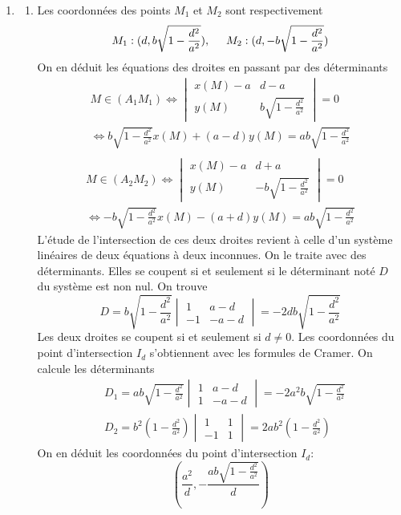 \begin{enumerate}
 \item
\begin{enumerate}
 \item Les coordonnées des points $M_1$ et $M_2$ sont respectivement
\begin{displaymath}
 M_1 : (d,b\sqrt{1-\frac{d^2}{a^2}}),\hspace{0.5cm} M_2 : (d,-b\sqrt{1-\frac{d^2}{a^2}})
\end{displaymath}
On en déduit les équations des droites en passant par des déterminants
\begin{multline*}
 M\in (A_1M_1)\Leftrightarrow
\begin{vmatrix}
 x(M) - a & d-a \\y(M) & b\sqrt{1-\frac{d^2}{a^2}}
\end{vmatrix}
=0 \\
\Leftrightarrow
b\sqrt{1-\frac{d^2}{a^2}}x(M)+(a-d)y(M) = ab\sqrt{1-\frac{d^2}{a^2}}\\
\end{multline*}
\begin{multline*}
M\in (A_2M_2)\Leftrightarrow
\begin{vmatrix}
 x(M) - a & d+a \\y(M) & -b\sqrt{1-\frac{d^2}{a^2}}
\end{vmatrix}
=0 \\
\Leftrightarrow
-b\sqrt{1-\frac{d^2}{a^2}}x(M) - (a+d)y(M) = ab\sqrt{1-\frac{d^2}{a^2}}
\end{multline*}
L'étude de l'intersection de ces deux droites revient à celle d'un système linéaires de deux équations à deux inconnues. On le traite avec des déterminants. Elles se coupent si et seulement si le déterminant noté $D$ du système est non nul. On trouve
\begin{displaymath}
 D = b\sqrt{1-\frac{d^2}{a^2}}
\begin{vmatrix}
  1 & a-d \\ -1 & -a-d
\end{vmatrix}
= -2db\sqrt{1-\frac{d^2}{a^2}}
\end{displaymath}
 Les deux droites se coupent si et seulement si $d\neq 0$.\newline
Les coordonnées du point d'intersection $I_d$ s'obtiennent avec les formules de Cramer. On calcule les déterminants
\begin{align*}
 &D_1= ab\sqrt{1-\frac{d^2}{a^2}} 
\begin{vmatrix}
 1 & a-d \\ 1 & -a-d
\end{vmatrix}
= -2a^2b\sqrt{1-\frac{d^2}{a^2}} \\
&D_2= b^2(1-\frac{d^2}{a^2}) 
\begin{vmatrix}
 1 & 1 \\ -1 & 1
\end{vmatrix}
= 2ab^2(1-\frac{d^2}{a^2})
\end{align*}
On en déduit les coordonnées du point d'intersection $I_d$:
\begin{displaymath}
 (\frac{a^2}{d}, -\frac{ab\sqrt{1-\frac{d^2}{a^2}}}{d})
\end{displaymath}


\end{enumerate}
\end{enumerate}
